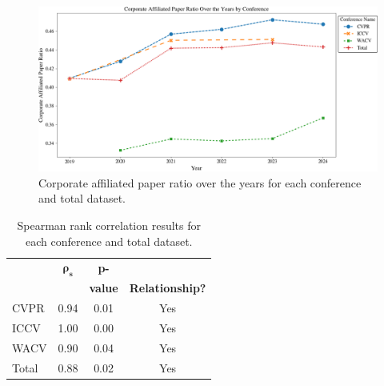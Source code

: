 \documentclass{article}
\begin{document}
\begin{figure}[ht]
  \centering
  \includegraphics[width=\textwidth]{report/images/corporate_ratio_graph_final.png}  
  \caption{Corporate affiliated paper ratio over the years for each conference and total dataset.}
  \label{fig:corporate_ratio_graph}
\end{figure}

\begin{table}[ht]
\centering
\begin{tabular}{|l|c|c|c|}
\hline
\textbf{} & \( \bm{\rho}_\bm{s} \) & \textbf{p-} & {\textbf{Significant}\\ \textbf{}&\textbf{}&\textbf{value}&\textbf{Relationship?}} \\ \hline
CVPR & 0.94 & 0.01 & Yes \\ \hline
ICCV & 1.00 & 0.00 & Yes \\ \hline
WACV & 0.90 & 0.04 & Yes \\ \hline
Total & 0.88 & 0.02 & Yes \\ \hline
\end{tabular}
\caption{Spearman rank correlation results for each conference and total dataset.}
\label{tab:spearman_results}
\end{table}
\end{document}

